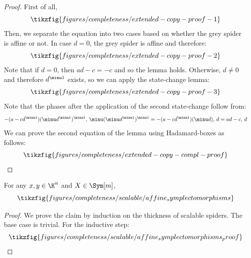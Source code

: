 \begin{proof}
  First of all,
  \begin{equation}
    \tikzfig{figures/completeness/extended-copy-proof-1}
  \end{equation}
  Then, we separate the equation into two cases based on whether the grey spider
  is affine or not.
  In case $d = 0$, the grey spider is affine and therefore:
  \begin{equation}
    \tikzfig{figures/completeness/extended-copy-proof-2}
  \end{equation}
  Note that if \(d = 0\), then \(ad - c = -c\) and so the lemma holds.
  Otherwise, \(d \neq 0\) and therefore \(d^{\minu 1}\) exists, so we can apply
  the state-change lemma:
  \begin{equation}
    \tikzfig{figures/completeness/extended-copy-proof-3}
  \end{equation}
  Note that the phases after the application of the second state-change
  follow from:
  \begin{equation}
    -(a - c d^{\minu 1})(\minu d^{\minu 1})^{\minu 1},
    \,  \minu(\minu d^{\minu 1})^{\minu 1}
    = -(a - c d^{\minu 1}) (\minu d), \,  d
    = ad - c, \, d
  \end{equation}
  We can prove the second equation of the lemma using Hadamard-boxes as
  follows:
  \begin{equation}
    \tikzfig{figures/completeness/extended-copy-compl-proof}
  \end{equation}
\end{proof}
\begin{lemma}
  \label{lem:affine_symplectomorphisms}
  For any \(x,y \in \K^n\) and \(X \in \Sym[m]\),
  \begin{equation*}
    \tikzfig{figures/completeness/scalable/affine_symplectomorphisms}
  \end{equation*}
\end{lemma}
\begin{proof}
  We prove the claim by induction on the thickness of scalable spiders.  The base case is trivial.  For the inductive step:
  \begin{equation}
    \tikzfig{figures/completeness/scalable/affine_symplectomorphisms_proof}
  \end{equation}
\end{proof}
